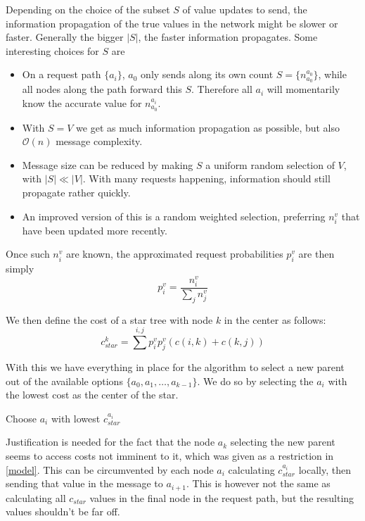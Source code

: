 \documentclass[a4paper, oneside]{discothesis}
\begin{document}
Depending on the choice of the subset $S$ of value updates to send, the information propagation of the true values in the network might be slower or faster. Generally the bigger $|S|$, the faster information propagates. Some interesting choices for $S$ are
\begin{itemize}
\item On a request path $\{a_i\}$, $a_0$ only sends along its own count $S=\{n_{a_0}^{a_0}\}$, while all nodes along the path forward this $S$. Therefore all $a_i$ will momentarily know the accurate value for $n_{a_0}^{a_i}$.
\item With $S=V$ we get as much information propagation as possible, but also $\mathcal{O}(n)$ message complexity.
\item Message size can be reduced by making $S$ a uniform random selection of $V$, with $|S|\ll|V|$. With many requests happening, information should still propagate rather quickly.
\item An improved version of this is a random weighted selection, preferring $n_i^v$ that have been updated more recently.
\end{itemize}

Once such $n_i^v$ are known, the approximated request probabilities $p_i^v$ are then simply
\begin{equation}
p_i^v=\frac{n_i^v}{\sum_jn_j^v}
\end{equation}

We then define the cost of a star tree with node $k$ in the center as follows:
\begin{equation}
c_{star}^k=\sum^{i,j}p_i^vp_j^v(c(i, k)+c(k,j))
\end{equation}

With this we have everything in place for the algorithm to select a new parent out of the available options $\{a_0,a_1,\dots,a_{k-1}\}$. We do so by selecting the $a_i$ with the lowest cost as the center of the star.

\begin{algorithmic}
\State\Return Choose $a_i$ with lowest $c_{star}^{a_i}$
\EndFunction
\end{algorithmic}

Justification is needed for the fact that the node $a_k$ selecting the new parent seems to access costs not imminent to it, which was given as a restriction in \ref{model}. This can be circumvented by each node $a_i$ calculating $c_{star}^{a_i}$ locally, then sending that value in the message to $a_{i+1}$. This is however not the same as calculating all $c_{star}$ values in the final node in the request path, but the resulting values shouldn't be far off.
\end{document}
